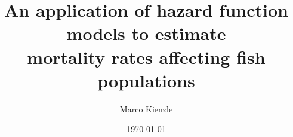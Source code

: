 \documentclass[xcolor=svgnames,aspectratio=169]{beamer}
\begin{document}
\title{An application of hazard function models to estimate \\ mortality rates affecting fish populations}
\author{Marco Kienzle}
\date{\today} 

\frame{\titlepage}




\end{document}
